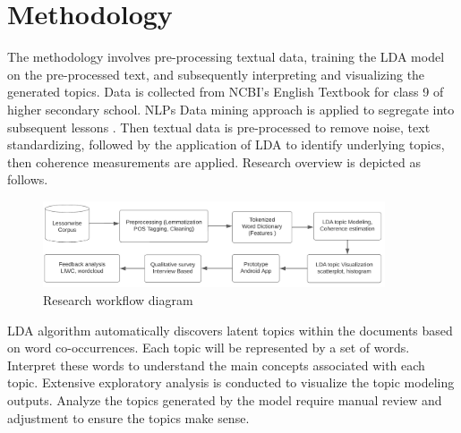 \documentclass[sn-mathphys,Numbered]{sn-jnl}%
\theoremstyle{thmstyleone}%
\theoremstyle{thmstyletwo}%
\theoremstyle{thmstylethree}%
\begin{document}
\section{Methodology}\label{methods}
The methodology involves pre-processing textual data, training the LDA model on the pre-processed text, and subsequently interpreting and visualizing the generated topics. Data is collected from NCBI's English Textbook for class 9 of higher secondary school. NLPs Data mining approach is applied to segregate into subsequent lessons \cite{kao_natural_2007, mccarthy_applied_2012}. Then textual data is pre-processed to remove noise, text standardizing, followed by the application of LDA to identify underlying topics, then coherence measurements are applied. Research overview is depicted as follows. 

\begin{figure}[h!]
\centering
\includegraphics[width=0.9\textwidth]{Figs/methodology.png}
\caption{Research workflow diagram}
\end{figure}

LDA algorithm automatically discovers latent topics within the documents based on word co-occurrences. Each topic will be represented by a set of words. Interpret these words to understand the main concepts associated with each topic. Extensive exploratory analysis is conducted to visualize the topic modeling outputs. Analyze the topics generated by the model require manual review and adjustment to ensure the topics make sense.
\end{document}
